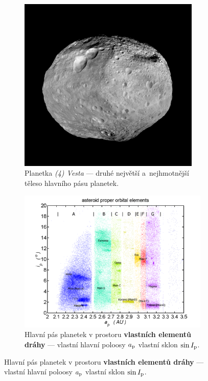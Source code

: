 \documentclass{beamer}
\newlength{\vyska}
\newlength{\vyskaA}
\newlength{\side}
\newlength{\main}
\begin{document}
\begin{frame}
\begin{columns}[t]
\begin{column}{\side}
\begin{tcolorbox}[title=Planetky ve sluneční soustavě\phantom{Úy},height=0.335\vyskaA,parbox=false]
		\begin{figure}[!htb]
			\begin{subfigure}[t]{0.44\textwidth}
			\centering
			\includegraphics[width=0.95\textwidth]{../obr/vesta.jpg}
			\caption{Planetka \textit{(4) Vesta} --- druhé největší a~nejhmotnější těleso hlavního pásu planetek.} 
			\label{fig:vesta}
			\end{subfigure}
			\begin{subfigure}[t]{0.55\textwidth}
			\centering
			\includegraphics[width=1.0\textwidth]{../obr/mainbelt.png}
			\caption{Hlavní pás planetek v prostoru \textbf{vlastních elementů dráhy} --- vlastní hlavní poloosy $a_{\rm p}$ vlastní sklon $\sin I_{\rm p}$.} \label{fig:belt}
			\end{subfigure}
		\end{figure}
	\end{tcolorbox}


\end{column}
\end{columns}
\end{frame}
\end{document}
